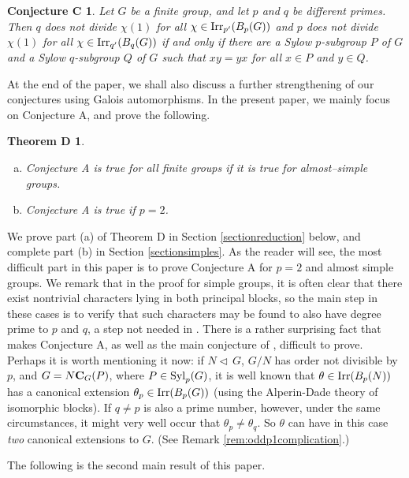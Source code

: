 \documentclass[12pt,leqno,a4paper]{amsart}
\def\syl#1#2{{\rm Syl}_#1(#2)}
\def\nor{\triangleleft\,}
\def\irr#1{{\rm Irr}(#1)}
\def\cent#1#2{{\bf C}_{#1}(#2)}
\def\irrp#1#2{{\rm Irr}_{#1'}(#2)}
\newtheorem*{conjC}{Conjecture C}
\newtheorem*{thmD}{Theorem D}
\theoremstyle{remark}
\begin{document}
\begin{conjC}
Let $G$ be a finite group, and let $p$ and $q$ be different primes.
Then $q$ does not divide $\chi(1)$ for all $\chi \in \irrp{p}{B_p(G)}$
and $p$ does not divide $\chi(1)$ for all $\chi \in \irrp{q}{B_q(G)}$
if and only if there are a Sylow $p$-subgroup $P$ of $G$
and a Sylow $q$-subgroup $Q$ of $G$ such that $xy=yx$ for all
$x \in P$ and $y \in Q$.
\end{conjC}

At the end of the paper, we shall also discuss a further strengthening of our conjectures using Galois automorphisms. In the present paper, we mainly focus on Conjecture A, and prove the following.


\begin{thmD}
\begin{enumerate}[(a)]


\item
Conjecture A is true for all finite groups if it is true for almost--simple groups.
\item
Conjecture A is true if $p=2$.
\end{enumerate}
 \end{thmD}
\medskip
 {We prove part (a) of Theorem D in Section \ref{sectionreduction} below, and complete part (b) in Section \ref{sectionsimples}.} As the reader will see, the most difficult part in this paper is to prove Conjecture A for $p=2$ and almost simple groups.  {We remark that in the proof for simple groups, it is often clear that there exist nontrivial characters lying in both principal blocks, so the main step in these cases is to verify that such characters may be found to also have degree prime to $p$ and $q$, a step not needed in  \cite{LWXZ}.}
There is a rather surprising fact that makes Conjecture A, as well as the main conjecture of \cite{LWXZ}, difficult to prove.
Perhaps it is worth mentioning it now: if $N\nor G$, $G/N$ has order not divisible by $p$,
and $G=N\cent GP$, where $P \in \syl pG$, it is well known that $\theta \in \irr{B_p(N)}$ has a canonical extension
$\theta_p \in \irr{B_p(G)}$  (using the Alperin-Dade theory of isomorphic blocks).
If $q \ne p$ is also a prime number, however, under the same circumstances, it might very well occur that $\theta_p \ne \theta_q$. So $\theta$
can have in this case {\sl two} canonical extensions to $G$. (See Remark \ref{rem:oddp1complication}.)

\medskip

The following is the second main result of this paper.
\end{document}

